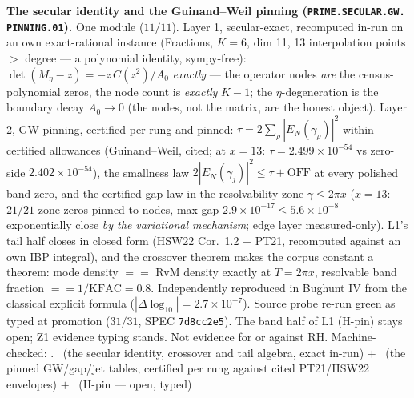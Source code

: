 \par\smallskip\noindent\textbf{The secular identity and the
Guinand--Weil pinning
(\texttt{PRIME.\allowbreak SECULAR.\allowbreak GW.\allowbreak
PINNING.01}).}
One module ($11/11$).  Layer 1, secular-exact, recomputed in-run
on an own exact-rational instance (Fractions, $K = 6$, dim 11,
13 interpolation points $>$ degree --- a polynomial identity,
sympy-free): $\det(M_\eta - z) = -z\,C(z^2)/A_0$ \emph{exactly}
--- the operator nodes \emph{are} the census-polynomial zeros,
the node count is \emph{exactly} $K - 1$; the $\eta$-degeneration
is the boundary decay $A_0 \to 0$ (the nodes, not the matrix,
are the honest object).  Layer 2, GW-pinning, certified per rung
and pinned: $\tau = 2\sum_\rho |E_N(\gamma_\rho)|^2$ within
certified allowances (Guinand--Weil, cited; at $x = 13$:
$\tau = 2.499\times10^{-54}$ vs zero-side $2.402\times10^{-54}$),
the smallness law $2|E_N(\gamma_j)|^2 \le \tau + \mathrm{OFF}$
at every polished band zero, and the certified gap law in the
resolvability zone $\gamma \le 2\pi x$ ($x = 13$: $21/21$ zone
zeros pinned to nodes, max gap $2.9\times10^{-17} \le
5.6\times10^{-8}$ --- exponentially close \emph{by the
variational mechanism}; edge layer measured-only).  L1's tail
half closes in closed form (HSW22 Cor.~1.2 $+$ PT21, recomputed
against an own IBP integral), and the crossover theorem makes
the corpus constant a theorem: mode density $==$ RvM density
exactly at $T = 2\pi x$, resolvable band fraction $==
1/\mathrm{KFAC} = 0.8$.  Independently reproduced in Bughunt IV
from the classical explicit formula ($|\Delta\log_{10}| =
2.7\times10^{-7}$).  Source probe re-run green as typed at
promotion ($31/31$, SPEC \texttt{7d8cc2e5}).  The band half of
L1 (H-pin) stays open; Z1 evidence typing stands.  Not evidence
for or against RH.
Machine-checked: .
\mE\ (the secular identity, crossover and tail algebra, exact
in-run) $+$ \mC\ (the pinned GW/gap/jet tables, certified per
rung against cited PT21/HSW22 envelopes) $+$ \mO\ (H-pin ---
open, typed)
\par\smallskip


